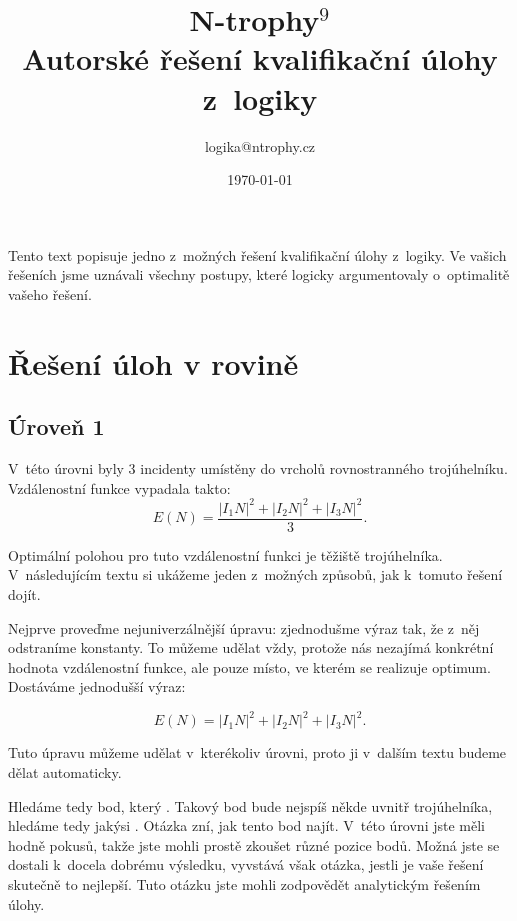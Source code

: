 \documentclass[12pt,a4paper]{article}
\begin{document}
\pagestyle{fancy}     %
\setcounter{page}{1}  %


\title{N-trophy$^9$\\Autorské řešení kvalifikační úlohy z~logiky}
\date{\today}
\author{logika@ntrophy.cz}
\maketitle

\setlength{\parindent}{0cm}
\setlength{\parskip}{3mm plus2pt minus2pt}

Tento text popisuje jedno z~možných řešení kvalifikační úlohy z~logiky. Ve
vašich řešeních jsme uznávali všechny postupy, které logicky argumentovaly
o~optimalitě vašeho řešení.

\section*{Řešení úloh v rovině}
\subsection*{Úroveň 1}

V~této úrovni byly 3 incidenty umístěny do vrcholů rovnostranného trojúhelníku.
Vzdálenostní funkce vypadala takto:
$$E(N) = \frac{|I_1N|^2 + |I_2N|^2 + |I_3N|^2}{3}.$$

Optimální polohou pro tuto vzdálenostní funkci je těžiště trojúhelníka.
V~následujícím textu si ukážeme jeden z~možných způsobů, jak k~tomuto řešení
dojít.

Nejprve proveďme nejuniverzálnější úpravu: zjednodušme výraz tak, že z~něj
odstraníme konstanty. To můžeme udělat vždy, protože nás nezajímá konkrétní
hodnota vzdálenostní funkce, ale pouze místo, ve kterém se realizuje optimum.
Dostáváme jednodušší výraz:

$$E(N) = |I_1N|^2 + |I_2N|^2 + |I_3N|^2.$$

Tuto úpravu můžeme udělat v~kterékoliv úrovni, proto ji v~dalším textu budeme
dělat automaticky.

Hledáme tedy bod, který . Takový bod bude
nejspíš někde uvnitř trojúhelníka, hledáme tedy jakýsi . Otázka zní,
jak tento bod najít. V~této úrovni jste měli hodně pokusů, takže jste mohli
prostě zkoušet různé pozice bodů. Možná jste se dostali k~docela dobrému
výsledku, vyvstává však otázka, jestli je vaše řešení skutečně to nejlepší.
Tuto otázku jste mohli zodpovědět analytickým řešením úlohy.
\end{document}
